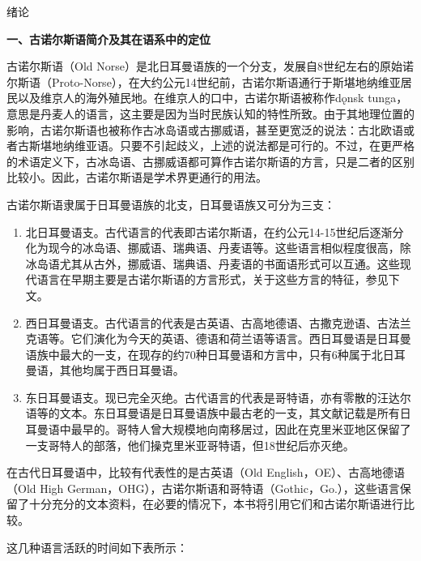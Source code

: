 绪论

\textbf{一、古诺尔斯语简介及其在语系中的定位}

古诺尔斯语（Old
Norse）是北日耳曼语族的一个分支，发展自8世纪左右的原始诺尔斯语（Proto-Norse），在大约公元14世纪前，古诺尔斯语通行于斯堪地纳维亚居民以及维京人的海外殖民地。在维京人的口中，古诺尔斯语被称作dǫnsk
tunga，意思是丹麦人的语言，这主要是因为当时民族认知的特性所致。由于其地理位置的影响，古诺尔斯语也被称作古冰岛语或古挪威语，甚至更宽泛的说法：古北欧语或者古斯堪地纳维亚语。只要不引起歧义，上述的说法都是可行的。不过，在更严格的术语定义下，古冰岛语、古挪威语都可算作古诺尔斯语的方言，只是二者的区别比较小。因此，古诺尔斯语是学术界更通行的用法。

古诺尔斯语隶属于日耳曼语族的北支，日耳曼语族又可分为三支：

\begin{enumerate}
\def\labelenumi{\arabic{enumi}.}
\item
  北日耳曼语支。古代语言的代表即古诺尔斯语，在约公元14-15世纪后逐渐分化为现今的冰岛语、挪威语、瑞典语、丹麦语等。这些语言相似程度很高，除冰岛语尤其从古外，挪威语、瑞典语、丹麦语的书面语形式可以互通。这些现代语言在早期主要是古诺尔斯语的方言形式，关于这些方言的特征，参见下文。
\item
  西日耳曼语支。古代语言的代表是古英语、古高地德语、古撒克逊语、古法兰克语等。它们演化为今天的英语、德语和荷兰语等语言。西日耳曼语是日耳曼语族中最大的一支，在现存的约70种日耳曼语和方言中，只有6种属于北日耳曼语，其他均属于西日耳曼语。
\item
  东日耳曼语支。现已完全灭绝。古代语言的代表是哥特语，亦有零散的汪达尔语等的文本。东日耳曼语是日耳曼语族中最古老的一支，其文献记载是所有日耳曼语中最早的。哥特人曾大规模地向南移居过，因此在克里米亚地区保留了一支哥特人的部落，他们操克里米亚哥特语，但18世纪后亦灭绝。
\end{enumerate}

在古代日耳曼语中，比较有代表性的是古英语（Old
English，OE）、古高地德语（Old High
German，OHG），古诺尔斯语和哥特语（Gothic，Go.），这些语言保留了十分充分的文本资料，在必要的情况下，本书将引用它们和古诺尔斯语进行比较。

这几种语言活跃的时间如下表所示：

